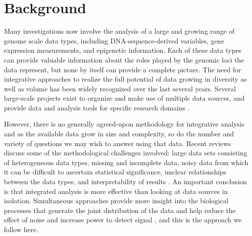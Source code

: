 \documentclass{bmcart}
\begin{document}



\section*{Background}
\label{sec:intro}

Many investigations now involve the analysis of a large and growing range of genome scale data types, including 
DNA-sequence-derived variables, gene expression measurements, and epigenetic information. Each of these data  types can 
provide valuable information about the roles played by the genomic loci the data represent, but none by itself can provide a 
complete picture. The need for integrative approaches to realize the full potential of data growing in diversity as well as volume 
has been widely recognized over the last several years.  Several large-scale projects exist to  organize and make use of multiple 
data sources, and provide data and analysis tools for specific research domains  \citep{ENCODE2004a, ENCODE2012a, 
Celniker2009a, TCGAsite}. 

However, there is no generally agreed-upon methodology for integrative analysis and as the available data grow in size and 
complexity, so do the number and variety of questions we may wish to answer using that data. Recent reviews discuss some of 
the methodological challenges involved: large data sets consisting of heterogeneous data types, missing and incomplete data, 
noisy data from which it can be difficult to ascertain statistical significance, unclear relationships between the data types, and 
interpretability of results  \citep{Hamid2009a, Hawkins2010a}. An important conclusion is that integrated analysis is more 
effective than looking at data sources in isolation.
Simultaneous approaches provide more insight into the biological processes that generate the joint distribution of the data 
\citep{Lemmens2006a} and help reduce the effect of noise and increase power to detect signal \citep{Tyekucheva2011a}, and 
this is the approach we follow here.
\end{document}
